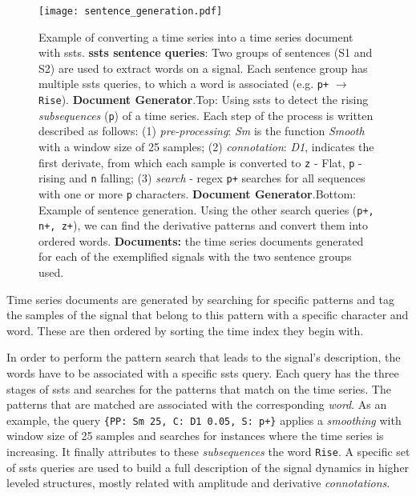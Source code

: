\begin{figure}[!h]
    \centering
    \texttt{[image: sentence\_generation.pdf]}
    \caption{Example of converting a time series into a time series document with \gls{ssts}. \textbf{\gls{ssts} sentence queries}: Two groups of sentences (S1 and S2) are used to extract words on a signal. Each sentence group has multiple \gls{ssts} queries, to which a word is associated (e.g. \texttt{p+} $\rightarrow$ \texttt{Rise}). \textbf{Document Generator}.Top: Using \gls{ssts} to detect the rising \textit{subsequences} (\texttt{p}) of a time series. Each step of the process is written described as follows: (1) \textit{pre-processing}: \textit{Sm} is the function \textit{Smooth} with a window size of 25 samples; (2) \textit{connotation}: \textit{D1}, indicates the first derivate, from which each sample is converted to \texttt{z} - Flat, \texttt{p} - rising and \texttt{n} falling; (3) \textit{search} - \gls{regex} \texttt{p+} searches for all sequences with one or more \texttt{p} characters. \textbf{Document Generator}.Bottom: Example of sentence generation. Using the other search queries (\texttt{p+, n+, z+}), we can find the derivative patterns and convert them into ordered words. \textbf{Documents:} the time series documents generated for each of the exemplified signals with the two sentence groups used.}
    \label{fig:SSTS_example}
\end{figure}

Time series documents are generated by searching for specific patterns and tag the samples of the signal that belong to this pattern with a specific character and word. These are then ordered by sorting the time index they begin with.
\par
In order to perform the pattern search that leads to the signal's description, the words have to be associated with a specific \gls{ssts} query. Each query has the three stages of \gls{ssts} and searches for the patterns that match on the time series. The patterns that are matched are associated with the corresponding \textit{word}. As an example, the query \texttt{\{PP: Sm 25, C: D1 0.05, S: p+\}} applies a \textit{smoothing} with window size of 25 samples and searches for instances where the time series is increasing. It finally attributes to these \textit{subsequences} the word \texttt{Rise}. A specific set of \gls{ssts} queries are used to build a full description of the signal dynamics in higher leveled structures, mostly related with amplitude and derivative \textit{connotations}. 

